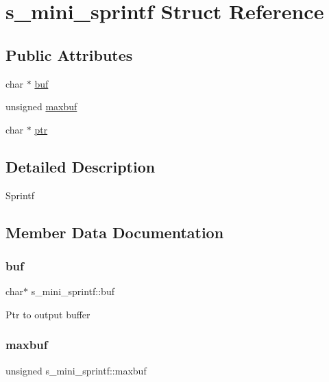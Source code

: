 \hypertarget{structs__mini__sprintf}{}\section{s\+\_\+mini\+\_\+sprintf Struct Reference}
\label{structs__mini__sprintf}
\subsection*{Public Attributes}
\begin{DoxyCompactItemize}
\item 
char $\ast$ \hyperlink{structs__mini__sprintf_a283977d644aa5766b9a073326cead04a}{buf}
\item 
unsigned \hyperlink{structs__mini__sprintf_aa72d7f12a63aac86d0fb8efca58d2508}{maxbuf}
\item 
char $\ast$ \hyperlink{structs__mini__sprintf_a2c9e792452e1d01c6315f7880d158d0a}{ptr}
\end{DoxyCompactItemize}


\subsection{Detailed Description}


 Sprintf 

\subsection{Member Data Documentation}
\mbox{\label{structs__mini__sprintf_a283977d644aa5766b9a073326cead04a}} 
\subsubsection{\texorpdfstring{buf}{buf}}
{\footnotesize\ttfamily char$\ast$ s\+\_\+mini\+\_\+sprintf\+::buf}

Ptr to output buffer \mbox{\label{structs__mini__sprintf_aa72d7f12a63aac86d0fb8efca58d2508}} 
\subsubsection{\texorpdfstring{maxbuf}{maxbuf}}
{\footnotesize\ttfamily unsigned s\+\_\+mini\+\_\+sprintf\+::maxbuf}

